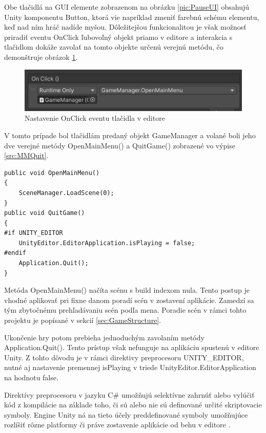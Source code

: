\documentclass[slovak, master]{diploma}
\begin{document}
Obe tlačidlá na GUI elemente zobrazenom na obrázku \ref{pic:PauseUI} obsahujú Unity komponentu Button, ktorá vie napríklad zmeniť farebnú schému elementu, keď nad ním hráč nadíde myšou. Dôležitejšou funkcionalitou je však možnosť priradiť eventu OnClick ľubovoľný objekt priamo v editore a interakcia s tlačidlom dokáže zavolať na tomto objekte určenú verejnú metódu, čo demonštruje obrázok \ref{pic:OnClick}. 

\begin{figure}[!htbp]
    \centering
    \includegraphics[width=.8\textwidth]{Figures/OnClick.png}
    \caption{Nastavenie OnClick eventu tlačidla v editore}
    \label{pic:OnClick}
\end{figure}

V tomto prípade bol tlačidlám predaný objekt GameManager a volané boli jeho dve verejné metódy OpenMainMenu() a QuitGame() zobrazené vo výpise \ref{src:MMQuit}.

\vspace{8pt}
\begin{lstlisting}[label=src:MMQuit,caption={Metódy na návrat do hlavnej ponuky a ukončenie hry}]
public void OpenMainMenu()
{
    SceneManager.LoadScene(0);
}
public void QuitGame()
{
#if UNITY_EDITOR
    UnityEditor.EditorApplication.isPlaying = false;
#endif
    Application.Quit();
}
\end{lstlisting}

Metóda OpenMainMenu() načíta scénu s build indexom nula. Tento postup je vhodné aplikovať pri fixne danom poradí scén v zostavení aplikácie. Zamedzí sa tým zbytočnému prehľadávaniu scén podľa mena. Poradie scén v rámci tohto projektu je popísané v sekcií \ref{sec:GameStructure}. 

Ukončenie hry potom prebieha jednoduchým zavolaním metódy Application.Quit(). Tento prístup však nefunguje na aplikáciu spustenú v editore Unity. Z tohto dôvodu je v rámci direktivy preprocesoru UNITY\_EDITOR, nutné aj nastavenie premennej isPlaying v triede UnityEditor.EditorApplication na hodnotu false. 

Direktívy preprocesoru v jazyku C\# umožňujú selektívne zahrnúť alebo vylúčiť kód z kompilácie na základe toho, či sú alebo nie sú definované určité skriptovacie symboly. Engine Unity ná na tieto účely preddefinované symboly umožňujúce rozlíšiť rôzne platformy či práve zostavenie aplikácie od behu v editore \cite{ConditionalCompilation}.
\end{document}
